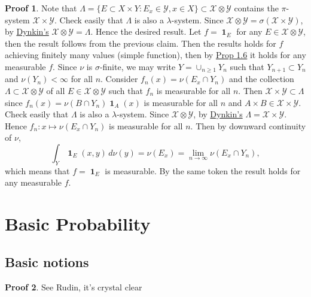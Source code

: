\documentclass[hidelinks,11pt]{article}
\theoremstyle{definition}
\theoremstyle{dotless}
\newtheorem{prop}{Proof}[section]
\theoremstyle{remark}
\DeclareMathOperator{\1}{\mathbf{1}}
\DeclareMathOperator{\0}{\mathbf{0}}
\begin{document}
\begin{prop}
Note that $\Lambda=\{E\subset X\times Y:E_x\in\mathcal{Y},x\in X\}\subset\mathcal{X}\otimes\mathcal{Y}$ contains the $\pi$-system $\mathcal{X}\times\mathcal{Y}$. Check easily that $\Lambda$ is also a $\lambda$-system. Since $\mathcal{X}\otimes\mathcal{Y}=\sigma(\mathcal{X}\times\mathcal{Y})$, by \hyperref[Dynkin's]{Dynkin's} $\mathcal{X}\otimes\mathcal{Y}=\Lambda$. Hence the desired result.\medbreak
Let $f=\1_E$ for any $E\in\mathcal{X}\otimes\mathcal{Y}$, then the result follows from the previous claim. Then the results holds for $f$ achieving finitely many values (simple function), then by \hyperref[Prop 1.6]{Prop 1.6} it holds for any measurable $f$.\medbreak
Since $\nu$ is $\sigma$-finite, we may write $Y=\cup_{n\geq1}Y_n$ such that $Y_{n+1}\subset Y_n$ and $\nu(Y_n)<\infty$ for all $n$. Consider $f_n(x)=\nu(E_x\cap Y_n)$ and the collection $\Lambda\subset\mathcal{X}\otimes\mathcal{Y}$ of all $E\in\mathcal{X}\otimes\mathcal{Y}$ such that $f_n$ is measurable for all $n$. Then $\mathcal{X}\times\mathcal{Y}\subset\Lambda$ since $f_n(x)=\nu(B\cap Y_n)\1_A(x)$ is measurable for all $n$ and $A\times B\in\mathcal{X}\times\mathcal{Y}$. Check easily that $\Lambda$ is also a $\lambda$-system. Since $\mathcal{X}\otimes\mathcal{Y}$, by \hyperref[Dynkin's]{Dynkin's} $\Lambda=\mathcal{X}\times\mathcal{Y}$. Hence $f_n:x\mapsto\nu(E_x\cap Y_n)$ is measurable for all $n$. Then by downward continuity of $\nu$,
\[\int_Y\1_E(x,y)\,d\nu(y)=\nu(E_x)=\lim_{n\to\infty}\nu(E_x\cap Y_n),\]
which means that $f=\1_E$ is measurable. By the same token the result holds for any measurable $f$.
\end{prop}

\section{Basic Probability}

\subsection{Basic notions}

\begin{prop}
See Rudin, it's crystal clear
\end{prop}
\end{document}
